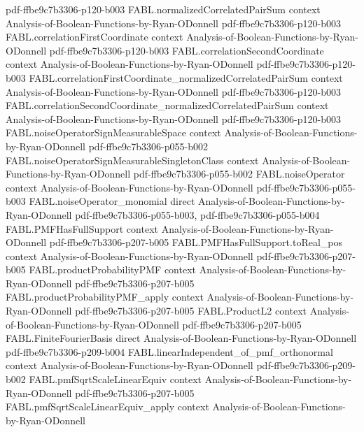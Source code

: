 \begin{theorem}
  {pdf-ffbe9c7b3306-p120-b003}
\proofstep
  {FABL.normalizedCorrelatedPairSum}
  {context}
  {Analysis-of-Boolean-Functions-by-Ryan-ODonnell}
  {pdf-ffbe9c7b3306-p120-b003}
\proofstep
  {FABL.correlationFirstCoordinate}
  {context}
  {Analysis-of-Boolean-Functions-by-Ryan-ODonnell}
  {pdf-ffbe9c7b3306-p120-b003}
\proofstep
  {FABL.correlationSecondCoordinate}
  {context}
  {Analysis-of-Boolean-Functions-by-Ryan-ODonnell}
  {pdf-ffbe9c7b3306-p120-b003}
\proofstep
  {FABL.correlationFirstCoordinate_normalizedCorrelatedPairSum}
  {context}
  {Analysis-of-Boolean-Functions-by-Ryan-ODonnell}
  {pdf-ffbe9c7b3306-p120-b003}
\proofstep
  {FABL.correlationSecondCoordinate_normalizedCorrelatedPairSum}
  {context}
  {Analysis-of-Boolean-Functions-by-Ryan-ODonnell}
  {pdf-ffbe9c7b3306-p120-b003}
\proofstep
  {FABL.noiseOperatorSignMeasurableSpace}
  {context}
  {Analysis-of-Boolean-Functions-by-Ryan-ODonnell}
  {pdf-ffbe9c7b3306-p055-b002}
\proofstep
  {FABL.noiseOperatorSignMeasurableSingletonClass}
  {context}
  {Analysis-of-Boolean-Functions-by-Ryan-ODonnell}
  {pdf-ffbe9c7b3306-p055-b002}
\proofstep
  {FABL.noiseOperator}
  {context}
  {Analysis-of-Boolean-Functions-by-Ryan-ODonnell}
  {pdf-ffbe9c7b3306-p055-b003}
\proofstep
  {FABL.noiseOperator_monomial}
  {direct}
  {Analysis-of-Boolean-Functions-by-Ryan-ODonnell}
  {pdf-ffbe9c7b3306-p055-b003,
    pdf-ffbe9c7b3306-p055-b004}
\proofstep
  {FABL.PMFHasFullSupport}
  {context}
  {Analysis-of-Boolean-Functions-by-Ryan-ODonnell}
  {pdf-ffbe9c7b3306-p207-b005}
\proofstep
  {FABL.PMFHasFullSupport.toReal_pos}
  {context}
  {Analysis-of-Boolean-Functions-by-Ryan-ODonnell}
  {pdf-ffbe9c7b3306-p207-b005}
\proofstep
  {FABL.productProbabilityPMF}
  {context}
  {Analysis-of-Boolean-Functions-by-Ryan-ODonnell}
  {pdf-ffbe9c7b3306-p207-b005}
\proofstep
  {FABL.productProbabilityPMF_apply}
  {context}
  {Analysis-of-Boolean-Functions-by-Ryan-ODonnell}
  {pdf-ffbe9c7b3306-p207-b005}
\proofstep
  {FABL.ProductL2}
  {context}
  {Analysis-of-Boolean-Functions-by-Ryan-ODonnell}
  {pdf-ffbe9c7b3306-p207-b005}
\proofstep
  {FABL.FiniteFourierBasis}
  {direct}
  {Analysis-of-Boolean-Functions-by-Ryan-ODonnell}
  {pdf-ffbe9c7b3306-p209-b004}
\proofstep
  {FABL.linearIndependent_of_pmf_orthonormal}
  {context}
  {Analysis-of-Boolean-Functions-by-Ryan-ODonnell}
  {pdf-ffbe9c7b3306-p209-b002}
\proofstep
  {FABL.pmfSqrtScaleLinearEquiv}
  {context}
  {Analysis-of-Boolean-Functions-by-Ryan-ODonnell}
  {pdf-ffbe9c7b3306-p207-b005}
\proofstep
  {FABL.pmfSqrtScaleLinearEquiv_apply}
  {context}
  {Analysis-of-Boolean-Functions-by-Ryan-ODonnell}

\end{theorem}
